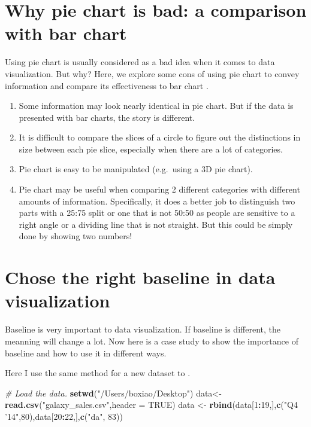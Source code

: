 \documentclass[]{book}
\newenvironment{Shaded}{\begin{snugshade}}{\end{snugshade}}
\newcommand{\KeywordTok}[1]{\textcolor[rgb]{0.13,0.29,0.53}{\textbf{#1}}}
\newcommand{\DataTypeTok}[1]{\textcolor[rgb]{0.13,0.29,0.53}{#1}}
\newcommand{\DecValTok}[1]{\textcolor[rgb]{0.00,0.00,0.81}{#1}}
\newcommand{\StringTok}[1]{\textcolor[rgb]{0.31,0.60,0.02}{#1}}
\newcommand{\CommentTok}[1]{\textcolor[rgb]{0.56,0.35,0.01}{\textit{#1}}}
\newcommand{\OtherTok}[1]{\textcolor[rgb]{0.56,0.35,0.01}{#1}}
\newcommand{\OperatorTok}[1]{\textcolor[rgb]{0.81,0.36,0.00}{\textbf{#1}}}
\newcommand{\NormalTok}[1]{#1}
\theoremstyle{definition}
\theoremstyle{definition}
\theoremstyle{definition}
\theoremstyle{remark}
\begin{document}
\section{Why pie chart is bad: a comparison with bar
chart}\label{why-pie-chart-is-bad-a-comparison-with-bar-chart}

Using pie chart is usually considered as a bad idea when it comes to
data visualization. But why? Here, we explore some cons of using pie
chart to convey information and compare its effectiveness to bar chart
\citep{hickey-pie-worst} \citep{henry-defense-pie} \citep{quach-penny}.

\begin{enumerate}
\def\labelenumi{\arabic{enumi}.}
\item
  Some information may look nearly identical in pie chart. But if the
  data is presented with bar charts, the story is different.
\item
  It is difficult to compare the slices of a circle to figure out the
  distinctions in size between each pie slice, especially when there are
  a lot of categories.
\item
  Pie chart is easy to be manipulated (e.g.~using a 3D pie chart).
\item
  Pie chart may be useful when comparing 2 different categories with
  different amounts of information. Specifically, it does a better job
  to distinguish two parts with a 25:75 split or one that is not 50:50
  as people are sensitive to a right angle or a dividing line that is
  not straight. But this could be simply done by showing two numbers!
\end{enumerate}

\section{Chose the right baseline in data
visualization}\label{chose-the-right-baseline-in-data-visualization}

Baseline is very important to data visualization. If baseline is
different, the meanning will change a lot. Now here is a case study to
show the importance of baseline and how to use it in different ways.

Here I use the same method for a new dataset to .

\begin{Shaded}
\begin{Highlighting}[]
\CommentTok{# Load the data.}
\KeywordTok{setwd}\NormalTok{(}\StringTok{"/Users/boxiao/Desktop"}\NormalTok{)}
\NormalTok{data<-}\KeywordTok{read.csv}\NormalTok{(}\StringTok{"galaxy_sales.csv"}\NormalTok{,}\DataTypeTok{header =} \OtherTok{TRUE}\NormalTok{)}
\NormalTok{data <-}\StringTok{ }\KeywordTok{rbind}\NormalTok{(data[}\DecValTok{1}\OperatorTok{:}\DecValTok{19}\NormalTok{,],}\KeywordTok{c}\NormalTok{(}\StringTok{"Q4 '14"}\NormalTok{,}\DecValTok{80}\NormalTok{),data[}\DecValTok{20}\OperatorTok{:}\DecValTok{22}\NormalTok{,],}\KeywordTok{c}\NormalTok{(}\StringTok{"da"}\NormalTok{, }\DecValTok{83}\NormalTok{))}
\end{Highlighting}
\end{Shaded}
\end{document}
